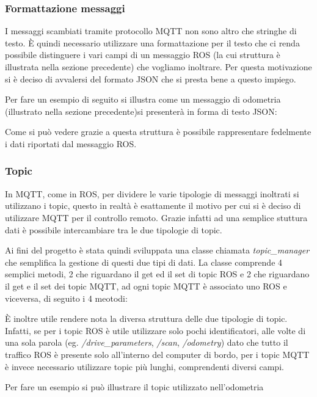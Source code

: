 \subsubsection{Formattazione messaggi}
I messaggi scambiati tramite protocollo MQTT non sono altro che stringhe di testo. È quindi necessario utilizzare una formattazione per il testo che ci renda possibile distinguere i vari campi di un messaggio ROS (la cui struttura è illustrata nella sezione precedente) che vogliamo inoltrare. Per questa motivazione si è deciso di avvalersi del formato JSON che si presta bene a questo impiego.

\noindent Per fare un esempio di seguito si illustra come un messaggio di odometria (illustrato nella sezione precedente)si presenterà in forma di testo JSON:



\noindent Come si può vedere grazie a questa struttura è possibile rappresentare fedelmente i dati riportati dal messaggio ROS.

\subsubsection{Topic}
In MQTT, come in ROS, per dividere le varie tipologie di messaggi inoltrati si utilizzano i topic, questo in realtà è esattamente il motivo per cui si è deciso di utilizzare MQTT per il controllo remoto. Grazie infatti ad una semplice stuttura dati è possibile intercambiare tra le due tipologie di topic.

\noindent Ai fini del progetto è stata quindi sviluppata una classe chiamata \textit{topic\_manager} che semplifica la gestione di questi due tipi di dati. La classe comprende 4 semplici metodi, 2 che riguardano il get ed il set di topic ROS e 2 che riguardano il get e il set dei topic MQTT, ad ogni topic MQTT è associato uno ROS e viceversa, di seguito i 4 meotodi:



\noindent È inoltre utile rendere nota la diversa struttura delle due tipologie di topic. Infatti, se per i topic ROS è utile utilizzare solo pochi identificatori, alle volte di una sola parola (eg. \textit{/drive\_parameters}, \textit{/scan}, \textit{/odometry}) dato che tutto il traffico ROS è presente solo all'interno del computer di bordo, per i topic MQTT è invece necessario utilizzare topic più lunghi, comprendenti diversi campi.

\noindent Per fare un esempio si può illustrare il topic utilizzato nell'odometria

